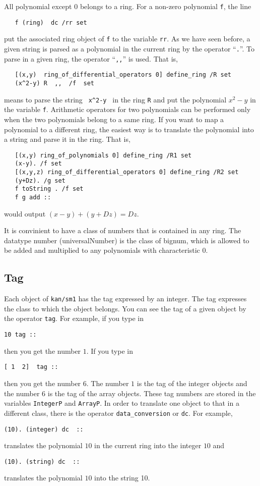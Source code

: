 All polynomial except $0$ belongs to a ring.
For a non-zero polynomial {\tt f},
the line
\begin{verbatim}
   f (ring)  dc /rr set
\end{verbatim}
put the associated ring object of {\tt f} to the variable {\tt rr}.
As we have seen before,
a given string is parsed as a polynomial in the current ring by the operator
``{\tt .}''.
To parse in a given ring,
the operator ``{\tt ,,}'' is used.
That is,
\begin{verbatim}
   [(x,y)  ring_of_differential_operators 0] define_ring /R set
   (x^2-y) R  ,,  /f  set
\end{verbatim}
means to parse the string \verb! x^2-y ! in the ring {\tt R}
and put the polynomial $x^2-y$ in the variable {\tt f}.
Arithmetic operators for two polynomials can be performed only
when the two polynomials belong to a same ring.
If you want to map a polynomial to a different ring,
the easiest way is to translate the polynomial into a string and
parse it in the ring.
That is,
\begin{verbatim}
   [(x,y) ring_of_polynomials 0] define_ring /R1 set
   (x-y). /f set
   [(x,y,z) ring_of_differential_operators 0] define_ring /R2 set
   (y+Dz). /g set
   f toString . /f set
   f g add ::
\end{verbatim}
would output
$ (x-y) + (y+Dz) = Dz$.

It is convinient to have a class of numbers that is contained in
any ring.
The datatype number (universalNumber) is the class of bignum, which is
allowed to be added and multiplied to any polynomials with characteristic 0.

\subsection{Tag}
Each object of {\tt kan/sm1} has the tag expressed by an integer.
The tag expresses the class to which the object belongs.
You can see the tag of a given object by the operator {\tt tag}.
For example, if you type in
\begin{verbatim}
10 tag ::
\end{verbatim}
then you get the number $1$.
If you type in
\begin{verbatim}
[ 1  2]  tag ::
\end{verbatim}
then you get the number $6$.
The number $1$ is the tag of the integer objects and
the number $6$ is the tag of the array objects.
These tag numbers are stored in the variables
{\tt IntegerP} and {\tt ArrayP}.
In order to translate one object to that in a different class,
there is the operator {\tt data\_conversion} or {\tt dc}.
For example,
\begin{verbatim}
(10). (integer) dc  ::
\end{verbatim}
translates the polynomial $10$ in the current ring into the integer $10$
and
\begin{verbatim}
(10). (string) dc  ::
\end{verbatim}
translates the polynomial $10$ into the string 10.

